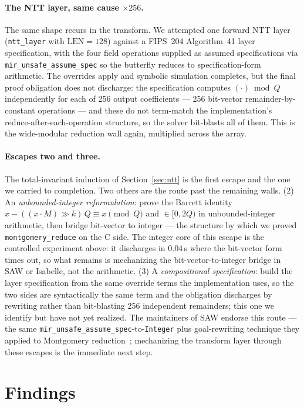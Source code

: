 \documentclass[journal=tches,submission,review]{iacrtrans}
\newcommand{\code}[1]{\texttt{#1}}
\begin{document}
\paragraph{The NTT layer, same cause $\times 256$.} The same shape recurs in the transform. We attempted
one forward NTT layer (\code{ntt\_layer} with $\mathrm{LEN}=128$) against a FIPS~204 Algorithm~41 layer
specification, with the four field operations supplied as assumed specifications via
\code{mir\_unsafe\_assume\_spec} so the butterfly reduces to specification-form arithmetic. The overrides
apply and symbolic simulation completes, but the final proof obligation does not discharge: the
specification computes $(\cdot) \bmod Q$ independently for each of 256 output coefficients ---
256 bit-vector remainder-by-constant operations --- and these do not term-match the implementation's
reduce-after-each-operation structure, so the solver bit-blasts all of them. This is the wide-modular
reduction wall again, multiplied across the array.

\paragraph{Escapes two and three.} The total-invariant induction of Section~\ref{sec:ntt} is the first
escape and the one we carried to completion. Two others are the route past the remaining walls.
(2) An \emph{unbounded-integer reformulation}: prove the Barrett identity
$x - ((x \cdot M)\gg k)\,Q \equiv x \pmod Q$ and $\in [0, 2Q)$ in unbounded-integer arithmetic, then
bridge bit-vector to integer --- the structure by which we proved \code{montgomery\_reduce} on the C side.
The integer core of this escape is the controlled experiment above: it discharges in $0.04$\,s where the
bit-vector form times out, so what remains is mechanizing the bit-vector-to-integer bridge in SAW or
Isabelle, not the arithmetic. (3) A \emph{compositional specification}: build the layer specification from
the same override terms the implementation uses, so the two sides are syntactically the same term and the
obligation discharges by rewriting rather than bit-blasting 256 independent remainders; this one we
identify but have not yet realized. The maintainers of SAW endorse this route --- the same
\code{mir\_unsafe\_assume\_spec}-to-\code{Integer} plus goal-rewriting technique they applied to
Montgomery reduction~\cite{saw3306}; mechanizing the transform layer through these escapes is the
immediate next step.

\section{Findings}\label{sec:findings}
\end{document}
